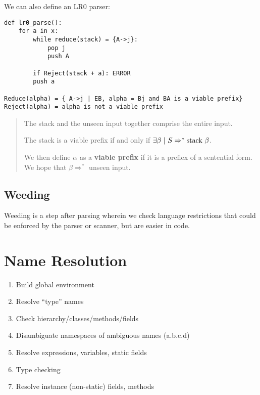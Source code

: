 \documentclass[12pt]{article}
\begin{document}
We can also define an LR0 parser:
\begin{verbatim}
def lr0_parse():
    for a in x:
        while reduce(stack) = {A->j}:
            pop j
            push A

        if Reject(stack + a): ERROR
        push a

Reduce(alpha) = { A->j | EB, alpha = Bj and BA is a viable prefix}
Reject(alpha) = alpha is not a viable prefix
\end{verbatim}

\begin{quote}
The stack and the unseen input together comprise the entire input.

The stack is a viable prefix if and only if $\exists\beta \ |\  S \Rightarrow^* \text{stack }\beta$.

We then define $\alpha$ as a {\bf viable prefix} if it is a prefiex of a sentential form. We hope that $\beta \Rightarrow^*$ unseen input.
\end{quote}

\subsection{Weeding}
Weeding is a step after parsing wherein we check language restrictions that could be enforced by the parser or scanner, but are easier in code.

\section{Name Resolution}
\begin{enumerate}
    \item Build global environment
    \item Resolve ``type'' names
    \item Check hierarchy/classes/methods/fields
    \item Disambiguate namespaces of ambiguous names (a.b.c.d)
    \item Resolve expressions, variables, static fields
    \item Type checking
    \item Resolve instance (non-static) fields, methods
\end{enumerate}
\end{document}
